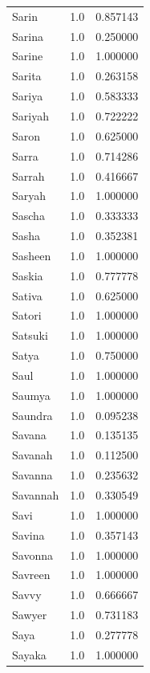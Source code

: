 \documentclass[
  letterpaper,
  DIV=11,
  numbers=noendperiod]{scrreprt}
\begin{document}
\begin{tabular}{lrr}
Sarin           &   1.0 &   0.857143 \\
Sarina          &   1.0 &   0.250000 \\
Sarine          &   1.0 &   1.000000 \\
Sarita          &   1.0 &   0.263158 \\
Sariya          &   1.0 &   0.583333 \\
Sariyah         &   1.0 &   0.722222 \\
Saron           &   1.0 &   0.625000 \\
Sarra           &   1.0 &   0.714286 \\
Sarrah          &   1.0 &   0.416667 \\
Saryah          &   1.0 &   1.000000 \\
Sascha          &   1.0 &   0.333333 \\
Sasha           &   1.0 &   0.352381 \\
Sasheen         &   1.0 &   1.000000 \\
Saskia          &   1.0 &   0.777778 \\
Sativa          &   1.0 &   0.625000 \\
Satori          &   1.0 &   1.000000 \\
Satsuki         &   1.0 &   1.000000 \\
Satya           &   1.0 &   0.750000 \\
Saul            &   1.0 &   1.000000 \\
Saumya          &   1.0 &   1.000000 \\
Saundra         &   1.0 &   0.095238 \\
Savana          &   1.0 &   0.135135 \\
Savanah         &   1.0 &   0.112500 \\
Savanna         &   1.0 &   0.235632 \\
Savannah        &   1.0 &   0.330549 \\
Savi            &   1.0 &   1.000000 \\
Savina          &   1.0 &   0.357143 \\
Savonna         &   1.0 &   1.000000 \\
Savreen         &   1.0 &   1.000000 \\
Savvy           &   1.0 &   0.666667 \\
Sawyer          &   1.0 &   0.731183 \\
Saya            &   1.0 &   0.277778 \\
Sayaka          &   1.0 &   1.000000 \\

\end{tabular}
\end{document}
